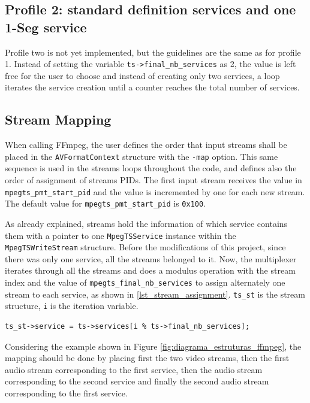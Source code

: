 \documentclass[
	12pt,				%
	openright,			%
	twoside,			%
	a4paper,			%
	brazil,
	french,				%
	english
	]{abntex2}
\begin{document}
\subsection{Profile 2: standard definition services and one 1-Seg service}

Profile two is not yet implemented, but the guidelines are the same as for profile 1. Instead of setting the variable \texttt{ts->final\_nb\_services} as 2, the value is left free for the user to choose and instead of creating only two services, a loop iterates the service creation until a counter reaches the total number of services.

\subsection{Stream Mapping}
\label{stream_mapping}

When calling FFmpeg, the user defines the order that input streams shall be placed in the \texttt{AVFormatContext} structure with the \texttt{-map} option. This same sequence is used in the streams loops throughout the code, and defines also the order of assignment of streams PIDs. The first input stream receives the value in \texttt{mpegts\_pmt\_start\_pid} and the value is incremented by one for each new stream. The default value for \texttt{mpegts\_pmt\_start\_pid} is \texttt{0x100}.

As already explained, streams hold the information of which service contains them with a pointer to one \texttt{MpegTSService} instance within the \texttt{MpegTSWriteStream} structure. Before the modifications of this project, since there was only one service, all the streams belonged to it. Now, the multiplexer iterates through all the streams and does a modulus operation with the stream index and the value of \texttt{mpegts\_final\_nb\_services} to assign alternately one stream to each service, as shown in \autoref{lst_stream_assignment}. \texttt{ts\_st} is the stream structure, \texttt{i} is the iteration variable.

\begin{lstlisting}[caption={Assigning streams to services.}, label={lst_stream_assignment}]
ts_st->service = ts->services[i % ts->final_nb_services];
\end{lstlisting}

Considering the example shown in Figure \ref{fig:diagrama_estruturas_ffmpeg}, the mapping should be done by placing first the two video streams, then the first audio stream corresponding to the first service, then the audio stream corresponding to the second service and finally the second audio stream corresponding to the first service.
\end{document}
